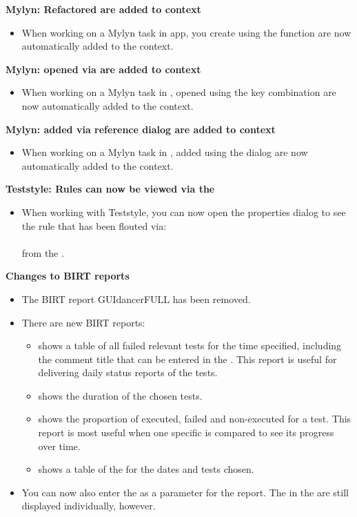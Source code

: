 \textbf{Mylyn: Refactored \gdcases{} are added to context}
\begin{itemize}
\item When working on a Mylyn task in app{}, \gdcases{} you create using the  function are now automatically added to the context.
\end{itemize}

\textbf{Mylyn: \gdcases{} opened via  are added to context}
\begin{itemize}
\item When working on a Mylyn task in \app{}, \gdcases{} opened using the key combination  are now automatically added to the context.
\end{itemize}

\textbf{Mylyn: \gdcases{} added via \gdcase{} reference dialog are added to context}
\begin{itemize}
\item When working on a Mylyn task in \app{}, \gdcases{} added using the  dialog are now automatically added to the context.
\end{itemize}

\textbf{Teststyle: Rules can now be viewed via the \gdpropview{}}
\begin{itemize}
\item When working with Teststyle, you can now open the \gdproject{} properties dialog to see the rule that has been flouted via:\\
\\
from the \gdprobview{}.
\end{itemize}

\textbf{Changes to BIRT reports}
\begin{itemize}
\item The BIRT report GUIdancerFULL has been removed.
\item There are new BIRT reports:
\begin{itemize}
\item {} shows a table of all failed relevant tests for the time specified, including the comment title that can be entered in the \gdtestsummaryview{}. This report is useful for delivering daily status reports of the tests.
\item {} shows the duration of the chosen tests.
\item {} shows the proportion of executed, failed and non-executed \gdsteps{} for a test. This report is most useful when one specific \gdsuite{} is compared to see its progress over time. 
\item {} shows a table of the \gdtestsummaryview{} for the dates and tests chosen. 
\end{itemize}
\item You can now also enter the \gdjob{} as a parameter for the report. The \gdsuites{} in the \gdjob{} are still displayed individually, however. 
\end{itemize}



